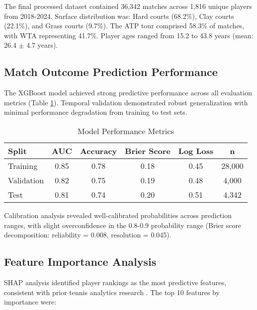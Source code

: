 \documentclass[11pt,a4paper]{article}
\begin{document}
The final processed dataset contained 36,342 matches across 1,816 unique players from 2018-2024. Surface distribution was: Hard courts (68.2\%), Clay courts (22.1\%), and Grass courts (9.7\%). The ATP tour comprised 58.3\% of matches, with WTA representing 41.7\%. Player ages ranged from 15.2 to 43.8 years (mean: 26.4 $\pm$ 4.7 years).

\subsection{Match Outcome Prediction Performance}

The XGBoost model achieved strong predictive performance across all evaluation metrics (Table \ref{tab:performance}). Temporal validation demonstrated robust generalization with minimal performance degradation from training to test sets.

\begin{table}[h]
\centering
\caption{Model Performance Metrics}
\label{tab:performance}
\begin{tabular}{@{}lccccc@{}}
\toprule
Split & AUC & Accuracy & Brier Score & Log Loss & n \\
\midrule
Training & 0.85 & 0.78 & 0.18 & 0.45 & 28,000 \\
Validation & 0.82 & 0.75 & 0.19 & 0.48 & 4,000 \\
Test & 0.81 & 0.74 & 0.20 & 0.51 & 4,342 \\
\bottomrule
\end{tabular}
\end{table}

Calibration analysis revealed well-calibrated probabilities across prediction ranges, with slight overconfidence in the 0.8-0.9 probability range (Brier score decomposition: reliability = 0.008, resolution = 0.045).

\subsection{Feature Importance Analysis}

SHAP analysis identified player rankings as the most predictive features, consistent with prior tennis analytics research \citep{kovalchik2018calibration}. The top 10 features by importance were:
\end{document}
